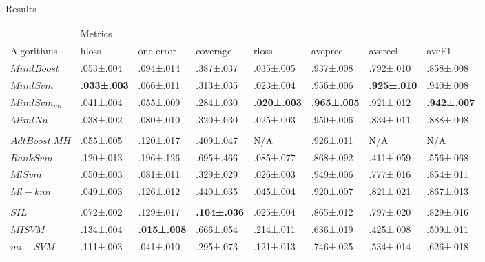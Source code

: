 \begin{frame}{Results}
\begin{tiny}
	\begin{table}[]
\centering
\begin{tabular}{llllllll}
\hline
 & \multicolumn{7}{l}{Metrics} \\ \cline{2-8} 
Algorithms & hloss & one-error & coverage & rloss & aveprec & averecl & aveF1 \\ \hline
$MimlBoost$ & .053±.004 & .094±.014 & .387±.037 & .035±.005 & .937±.008 & .792±.010 & .858±.008 \\
$MimlSvm$ & \textbf{.033±.003} & .066±.011 & .313±.035 & .023±.004 & .956±.006 & \textbf{.925±.010} & .940±.008 \\
$MimlSvm_{mi}$ & .041±.004 & .055±.009 & .284±.030 & \textbf{.020±.003} & \textbf{.965±.005} & .921±.012 & \textbf{.942±.007} \\
$MimlNn$ & .038±.002 & .080±.010 & .320±.030 & .025±.003 & .950±.006 & .834±.011 & .888±.008 \\
 &  &  &  &  &  &  &  \\
$AdtBoost.MH$ &  .055±.005 & .120±.017 & .409±.047 & N/A & .926±.011 & N/A & N/A\\
$RankSvm$ & .120±.013 & .196±.126 & .695±.466 & .085±.077 & .868±.092 & .411±.059 & .556±.068 \\
$MlSvm$ & .050±.003 & .081±.011 & .329±.029 & .026±.003 & .949±.006 & .777±.016 & .854±.011\\
$Ml-knn$ & .049±.003 & .126±.012 & .440±.035 & .045±.004 & .920±.007 & .821±.021 & .867±.013 \\
 &  &  &  &  &  &  &  \\
$SIL$ & .072±.002 & .129±.017 & \textbf{.104±.036} & .025±.004 & .865±.012 & .797±.020 & .829±.016 \\
$MISVM$ & .134±.004 & \textbf{.015±.008} & .666±.054 & .214±.011 & .636±.019 & .425±.008 & .509±.011 \\
$mi-SVM$ & .111±.003 & .041±.010 & .295±.073 & .121±.013 & .746±.025 & .534±.014 & .626±.018 \\ \hline
\end{tabular}
\end{table}
\end{tiny}
\end{frame}

